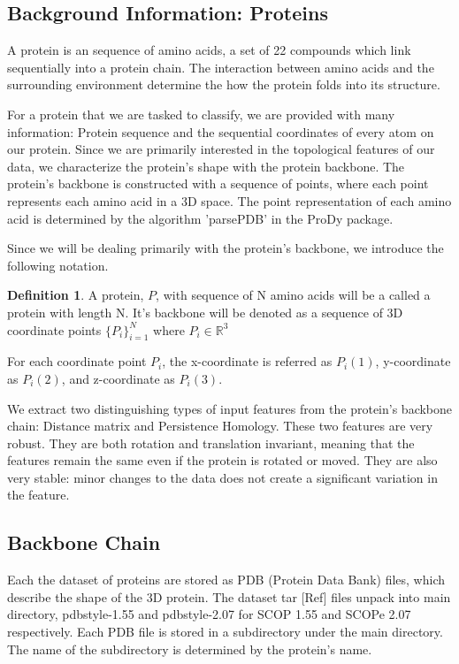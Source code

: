 \documentclass[12pt, a4paper, twocolumn, fullpage]{article}
\theoremstyle{plain}
\theoremstyle{definition}
\newtheorem{defn}{Definition}[section]
\theoremstyle{remark}
\begin{document}
\subsection{ Background Information: Proteins} \label{Background Information: Proteins}
A protein is an sequence of amino acids, a set of 22 compounds which link sequentially into a protein chain. The interaction between amino acids and the surrounding environment determine the how the protein folds into its structure.

For a protein that we are tasked to classify, we are provided with many information: Protein sequence and the sequential coordinates of every atom on our protein. Since we are primarily interested in the topological features of our data, we characterize the protein's shape with the protein backbone. The protein's backbone is constructed with a sequence of points, where each point represents each amino acid in a 3D space. The point representation of each amino acid is determined by the algorithm 'parsePDB' in the ProDy package. 

Since we will be dealing primarily with the protein's backbone, we introduce the following notation.
    
\begin{defn}
A protein, $P$, with sequence of N amino acids will be a called a protein with length N. It's backbone will be denoted as a sequence of 3D coordinate points $ \{P_i\}^{N}_{i=1} $ where $P_{i} \in \mathbb{R}^3 $

For each coordinate point $ P_{i} $, the x-coordinate is referred as $ P_{i}(1) $, y-coordinate as $ P_{i}(2) $, and z-coordinate as $ P_{i}(3) $.
\end{defn}

We extract two distinguishing types of input features from the protein's backbone chain: Distance matrix and Persistence Homology. These two features are very robust. They are both rotation and translation invariant, meaning that the features remain the same even if the protein is rotated or moved. They are also very stable: minor changes to the data does not create a significant variation in the feature.
    
\subsection{ Backbone Chain}
Each the dataset of proteins are stored as PDB (Protein Data Bank) files, which describe the shape of the 3D protein. The dataset tar [Ref] files unpack into main directory, pdbstyle-1.55 and pdbstyle-2.07 for SCOP 1.55 and SCOPe 2.07 respectively. Each PDB file is stored in a subdirectory under the main directory. The name of the subdirectory is determined by the protein's name.
\end{document}
